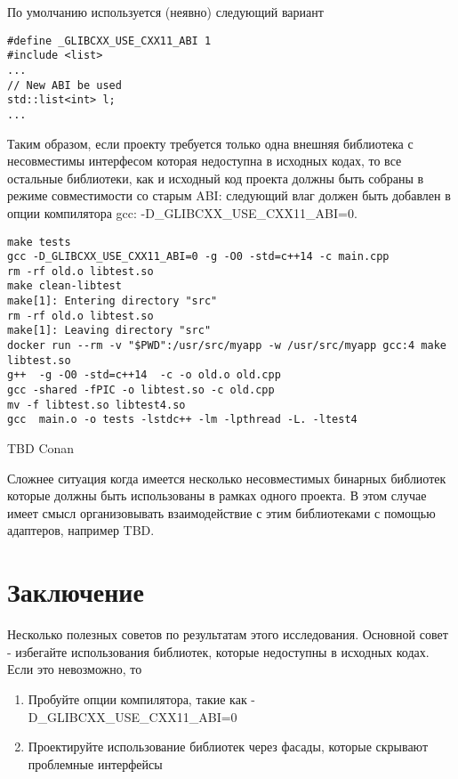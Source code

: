 \documentclass[14pt,a4paper]{article}
\begin{document}
По умолчанию используется (неявно) следующий вариант
\begin{verbatim}
#define _GLIBCXX_USE_CXX11_ABI 1
#include <list>
...
// New ABI be used
std::list<int> l;
...
\end{verbatim} 

Таким образом, если проекту требуется только одна внешняя библиотека с
несовместимы интерфесом которая недоступна в исходных кодах, то все
остальные библиотеки, как и исходный код проекта должны быть собраны в
режиме совместимости со старым ABI: следующий влаг должен быть
добавлен в опции компилятора gcc:
-D\_GLIBCXX\_USE\_CXX11\_ABI=0. 

\begin{verbatim}  
make tests
gcc -D_GLIBCXX_USE_CXX11_ABI=0 -g -O0 -std=c++14 -c main.cpp
rm -rf old.o libtest.so
make clean-libtest
make[1]: Entering directory "src"
rm -rf old.o libtest.so
make[1]: Leaving directory "src"
docker run --rm -v "$PWD":/usr/src/myapp -w /usr/src/myapp gcc:4 make libtest.so
g++  -g -O0 -std=c++14  -c -o old.o old.cpp
gcc -shared -fPIC -o libtest.so -c old.cpp
mv -f libtest.so libtest4.so
gcc  main.o -o tests -lstdc++ -lm -lpthread -L. -ltest4
\end{verbatim}

TBD Conan

Сложнее ситуация когда имеется несколько несовместимых бинарных
библиотек которые должны быть использованы в рамках одного проекта.
В этом случае имеет смысл организовывать взаимодействие с этим
библиотеками с помощью адаптеров, например TBD.

\section*{Заключение}
Несколько полезных советов по результатам этого исследования. Основной
совет - избегайте использования библиотек, которые недоступны в
исходных кодах. Если это невозможно, то
\begin{enumerate}
\item Пробуйте опции компилятора, такие как
  -D\_GLIBCXX\_USE\_CXX11\_ABI=0
\item Проектируйте использование библиотек через фасады, которые
  скрывают проблемные интерфейсы
\end{enumerate}

\end{document}

